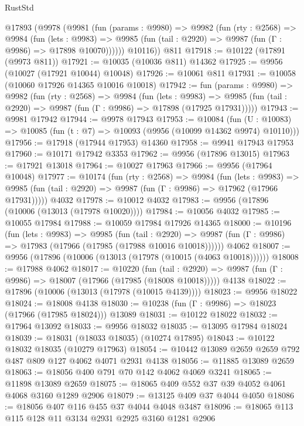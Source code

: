 \begin{lexlean}{RustStd}
\begin{coremodule}
    @17893
      (@9978
        (@9981
          (fun (params : @9980) =>
          @9982
            (fun (rty : @2568) =>
            @9984
              (fun (lets : @9983) =>
              @9985 (fun (tail : @2920) => @9987 (fun (Γ : @9986) => @17898 @10070))))))
        @10116))
    @811
@17918 := @10122 (@17891 (@9973 @811))
@17921 := @10035 (@10036 @811) @14362
@17925 := @9956 (@10027 (@17921 @10044) @10048)
@17926 := @10061 @811
@17931 := @10058 (@10060 @17926 @14365 @10016 @10018)
@17942 := fun (params : @9980) =>
  @9982
    (fun (rty : @2568) =>
    @9984
      (fun (lets : @9983) =>
      @9985 (fun (tail : @2920) => @9987 (fun (Γ : @9986) => @17898 (@17925 @17931)))))
@17943 := @9981 @17942
@17944 := @9978 @17943
@17953 := @10084
    (fun (U : @10083) => @10085 (fun (t : @7) => @10093 (@9956 (@10099 @14362 @9974) @10110)))
@17956 := @17918 (@17944 @17953) @14360
@17958 := @9941 @17943 @17953
@17960 := @10171 @17942 @3353
@17962 := @9956 (@17896 @13015)
@17963 := @17921 @13018
@17964 := @10027 @17963
@17966 := @9956 (@17964 @10048)
@17977 := @10174
    (fun (rty : @2568) =>
    @9984
      (fun (lets : @9983) =>
      @9985 (fun (tail : @2920) => @9987 (fun (Γ : @9986) => @17962 (@17966 @17931)))))
    @4032
@17978 := @10012 @4032
@17983 := @9956 (@17896 (@10006 (@13013 (@17978 @10020))))
@17984 := @10056 @4032
@17985 := @10055 @17984
@17988 := @10059 @17984 @17926 @14365
@18000 := @10196
    (fun (lets : @9983) =>
    @9985
      (fun (tail : @2920) =>
      @9987 (fun (Γ : @9986) => @17983 (@17966 (@17985 (@17988 @10016 @10018))))))
    @4062
@18007 := @9956 (@17896 (@10006 (@13013 (@17978 (@10015 (@4063 @10018))))))
@18008 := @17988 @4062
@18017 := @10220
    (fun (tail : @2920) => @9987 (fun (Γ : @9986) => @18007 (@17966 (@17985 (@18008 @10018)))))
    @4138
@18022 := @17896 (@10006 (@13013 (@17978 (@10015 @4139))))
@18023 := @9956 @18022
@18024 := @18008 @4138
@18030 := @10238 (fun (Γ : @9986) => @18023 (@17966 (@17985 @18024))) @13089
@18031 := @10122 @18022
@18032 := @17964 @13092
@18033 := @9956 @18032
@18035 := @13095 @17984 @18024
@18039 := @18031 (@18033 @18035) (@10274 @17895)
@18043 := @10122 @18032 @18035 (@10279 @17963)
@18054 := @10442 @13089 @2659 @2659 @792 @487 @809 @127 @4062 @4071 @2931 @4138
@18056 := @11885 @13089 @2659
@18063 := @18056 @400 @791 @70 @142 @4062 @4069 @3241
@18065 := @11898 @13089 @2659
@18075 := @18065 @409 @552 @37 @39 @4052 @4061 @4068 @3160 @1289 @2906
@18079 := @13125 @409 @37 @4044 @4050
@18086 := @18056 @407 @116 @455 @37 @4044 @4048 @3487
@18096 := @18065 @113 @115 @128 @11 @3134 @2931 @2925 @3160 @1281 @2906

\end{coremodule}
\end{lexlean}

